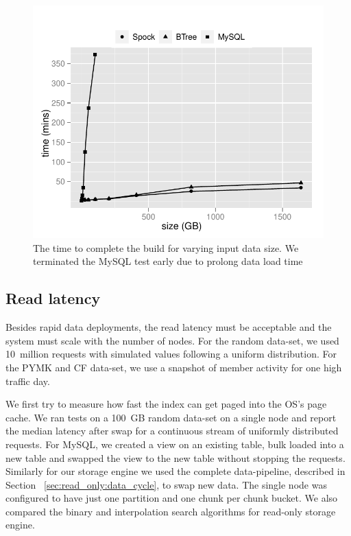 \begin{figure}
  \centering
    \includegraphics[scale=0.55]{images/build.pdf}
  \caption{The time to complete the build for varying input data size. We terminated the MySQL test early due to prolong data load time} 
  \label{build}
\end{figure}

\subsection{Read latency}

Besides rapid data deployments, the read latency must be acceptable
and the system must scale with the number of nodes. For the random
data-set, we used 10~million requests with simulated values following
a uniform distribution. For the PYMK and CF data-set, we use a
snapshot of member activity for one high traffic day.

We first try to measure how fast the index can get paged into the OS's
page cache. We ran tests on a 100~GB random data-set on a single node
and report the median latency after swap for a continuous stream of 
uniformly distributed requests. For MySQL, we created a view 
on an existing table, bulk loaded into a new table and swapped the view 
to the new table without stopping the requests. Similarly for our 
storage engine we used the complete data-pipeline, described in Section
~\ref{sec:read_only:data_cycle}, to swap new data. The single node was 
configured to have just one partition and one chunk per chunk bucket. 
We also compared the binary and interpolation search algorithms for 
read-only storage engine.  


